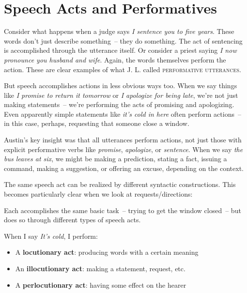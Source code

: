 \section{Speech Acts and Performatives}\label{sec:speech-acts}

Consider what happens when a judge says \textit{I sentence you to five years}. These words don't just describe something~-- they do something. The act of sentencing is accomplished through the utterance itself. Or consider a priest saying \textit{I now pronounce you husband and wife}. Again, the words themselves perform the action. These are clear examples of what J. L. \citet{austin1962} called \textsc{performative utterances}.

But speech accomplishes actions in less obvious ways too. When we say things like \textit{I promise to return it tomorrow} or \textit{I apologize for being late}, we're not just making statements~-- we're performing the acts of promising and apologizing. Even apparently simple statements like \textit{it's cold in here} often perform actions~-- in this case, perhaps, requesting that someone close a window.

Austin's key insight was that all utterances perform actions, not just those with explicit performative verbs like \textit{promise}, \textit{apologize}, or \textit{sentence}. When we say \textit{the bus leaves at six}, we might be making a prediction, stating a fact, issuing a command, making a suggestion, or offering an excuse, depending on the context.

The same speech act can be realized by different syntactic constructions. This becomes particularly clear when we look at requests/directions:

\ea
   \z
\z

Each accomplishes the same basic task~-- trying to get the window closed~-- but does so through different types of speech acts.

When I say \textit{It's cold}, I perform:
\begin{itemize}[noitemsep]
   \item A \textbf{locutionary act}: producing words with a certain meaning
   \item An \textbf{illocutionary act}: making a statement, request, etc.
   \item A \textbf{perlocutionary act}: having some effect on the hearer
\end{itemize}

